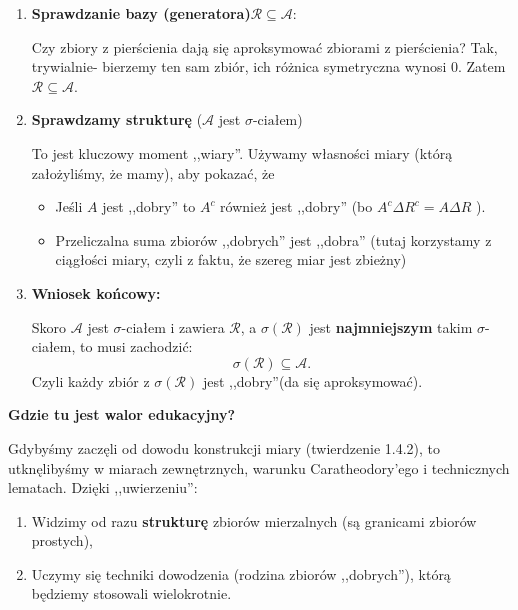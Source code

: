 \begin{remark}[Wiara.]
\begin{enumerate}[label=\arabic*)]
	\item \textbf{Sprawdzanie bazy (generatora)}$\bm{ \mathcal{R}\subseteq \mathcal{A} } :$ 
	
		Czy zbiory z pierścienia dają się aproksymować zbiorami z pierścienia? Tak, trywialnie- bierzemy ten sam zbiór, ich różnica symetryczna wynosi 0. Zatem $\mathcal{R} \subseteq \mathcal{A}$.

\item \textbf{Sprawdzamy strukturę} ($\bm{\mathcal{A}}$ jest $\sigma\text{-ciałem}$) 

		To jest kluczowy moment ,,wiary''. Używamy własności miary (którą założyliśmy, że mamy), aby pokazać, że
		\begin{itemize}
			\item Jeśli $A$ jest ,,dobry'' to $A^{c}$ również jest ,,dobry'' (bo $A^{c}\Delta R^{c} = A \Delta R$ ).
			\item Przeliczalna suma zbiorów ,,dobrych'' jest ,,dobra'' (tutaj korzystamy z ciągłości miary, czyli z faktu, że szereg miar jest zbieżny)
		\end{itemize}

	\item \textbf{Wniosek końcowy:} 

		Skoro $\mathcal{A}$ jest $\sigma $-ciałem i zawiera $\mathcal{R}$, a $\sigma\left( \mathcal{R} \right) $ jest \textbf{najmniejszym} takim $\sigma $-ciałem, to musi zachodzić:
		\[
		\sigma\left( \mathcal{R} \right) \subseteq \mathcal{A}
		.\] 
		Czyli każdy zbiór z $\sigma\left( \mathcal{R} \right) $ jest ,,dobry''(da się aproksymować).
\end{enumerate}
\noindent \textbf{Gdzie tu jest walor edukacyjny?}

Gdybyśmy zaczęli od dowodu konstrukcji miary (twierdzenie 1.4.2), to utknęlibyśmy w miarach zewnętrznych, warunku Caratheodory'ego i technicznych lematach. Dzięki ,,uwierzeniu'':
\begin{enumerate}[label=\arabic*)]
	\item Widzimy od razu \textbf{strukturę} zbiorów mierzalnych (są granicami zbiorów prostych),
	\item Uczymy się techniki dowodzenia (rodzina zbiorów ,,dobrych''), którą będziemy stosowali wielokrotnie.
\end{enumerate}
\end{remark} 

